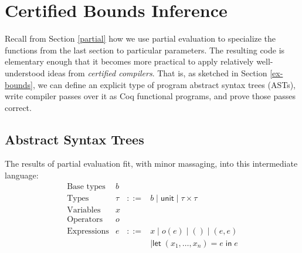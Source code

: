 \documentclass[conference,letterpaper]{IEEEtran}
\newcommand{\kw}[1]{\mathsf{#1}}
\begin{document}


\section{Certified Bounds Inference}\label{bounds}

Recall from Section \ref{partial} how we use partial evaluation to specialize the functions from the last section to particular parameters.
The resulting code is elementary enough that it becomes more practical to apply relatively well-understood ideas from \emph{certified compilers}.
That is, as sketched in Section \ref{ex-bounds}, we can define an explicit type of program abstract syntax trees (ASTs), write compiler passes over it as Coq functional programs, and prove those passes correct.

\subsection{Abstract Syntax Trees}

The results of partial evaluation fit, with minor massaging, into this intermediate language:
$$\begin{array}{rrcl}
  \textrm{Base types} & b \\
  \textrm{Types} & \tau &::=& b \mid \kw{unit} \mid \tau \times \tau \\
  \textrm{Variables} & x \\
  \textrm{Operators} & o \\
  \textrm{Expressions} & e &::=& x \mid o(e) \mid () \mid (e, e) \\
  &&& \mid \kw{let} \; (x_1, \ldots, x_n) = e \; \kw{in} \; e
\end{array}$$
\end{document}
